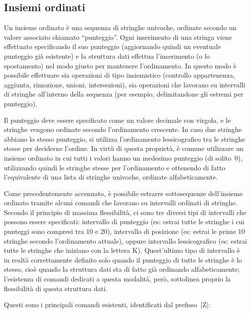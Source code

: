 \subsection{Insiemi ordinati}

Un insieme ordinato è una sequenza di stringhe univoche, ordinate secondo un valore associato
chiamato ``punteggio''. Ogni inserimento di una stringa viene effettuato specificando il suo
punteggio (aggiornando quindi un eventuale punteggio già esistente) e la struttura dati effettua
l'inserimento (o lo spostamento) nel modo giusto per mantenere l'ordinamento. In questo modo è
possibile effettuare sia operazioni di tipo insiemistico (controllo appartenenza, aggiunta,
rimozione, unioni, intersezioni), sia operazioni che lavorano su intervalli di stringhe all'interno
della sequenza (per esempio, delimitandone gli estremi per punteggio).

Il punteggio deve essere specificato come un valore decimale con virgola, e le stringhe vengono
ordinate secondo l'ordinamento crescente. In caso due stringhe abbiano lo stesso punteggio, si
utilizza l'ordinamento lessicografico tra le stringhe stesse per deciderne l'ordine. In virtù di
questa proprietà, è comune utilizzare un insieme ordinato in cui tutti i valori hanno un medesimo
punteggio (di solito~0), utilizzando quindi le stringhe stesse per l'ordinamento e ottenendo di
fatto l'equivalente di una lista di stringhe univoche, ordinate alfabeticamente.

Come precedentemente accennato, è possibile estrarre sotto\-se\-quen\-ze dell'insieme ordinato tramite
alcuni comandi che lavorano su intervalli ordinati di stringhe. Secondo il principio di massima
flessibilità, ci sono tre diversi tipi di intervalli che possono essere specificati: intervallo di
punteggio (es: estrai tutte le stringhe i cui punteggi sono compresi tra 10 e 20), intervallo di
posizione (es: estrai le prime 10 stringhe secondo l'ordinamento attuale), oppure intervallo
lessicografico (es: estrai tutte le stringhe che iniziano con la lettera K). Quest'ultimo tipo di
intervallo è in realtà correttamente definito solo quando il punteggio di tutte le stringhe è lo
stesso, cioè quando la struttura dati sta di fatto già ordinando alfabeticamente; l'esistenza
di comandi dedicati a questa modalità, però, sottolinea proprio la flessibilità di questa struttura dati.

Questi sono i principali comandi esistenti, identificati dal pre\-fis\-so~\cverb|Z|:

